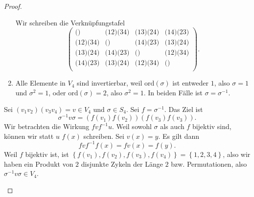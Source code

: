 \begin{proof}
\begin{parts}
\begin{enumerate}[label=(\roman*)]
	Wir schreiben die Verknüpfungstafel
\[
\left(
\begin{array}{cccc}
 \text{()} & \text{(12)(34)} & \text{(13)(24)} & \text{(14)(23)} \\
 \text{(12)(34)} & \text{()} & \text{(14)(23)} & \text{(13)(24)} \\
 \text{(13)(24)} & \text{(14)(23)} & \text{()} & \text{(12)(34)} \\
 \text{(14)(23)} & \text{(13)(24)} & \text{(12)(34)} & \text{()} \\
\end{array}
\right)
.\] 
\item Alle Elemente in $V_4$ sind invertierbar, weil $\text{ord}(\sigma)$ ist entweder $1$, also $\sigma=1$ und $\sigma^2=1$, oder $\text{ord}(\sigma)=2$, also $\sigma^2=1$. In beiden Fälle ist $\sigma=\sigma^{-1}$.
\end{enumerate}
\item Sei $(v_1v_2)(v_3v_4)=v\in V_4$ und $\sigma\in S_4$. Sei $f=\sigma^{-1}$. Das Ziel ist
\[
	\sigma^{-1}v\sigma=(f(v_1)f(v_2))(f(v_3)f(v_3))
.\] 
Wir betrachten die Wirkung $f v f^{-1} u$. Weil sowohl $\sigma$ als auch $f$ bijektiv sind, können wir statt $u$ $f(x)$ schreiben. Sei $v(x)=y$. Es gilt dann
\[
	fvf^{-1}f(x)=fv(x)=f(y)
.\]
Weil $f$ bijektiv ist, ist $\left\{ f(v_1),f(v_2),f(v_3),f(v_4) \right\} =\left\{ 1,2,3,4 \right\} $, also wir haben ein Produkt von $2$ disjunkte Zykeln der Länge $2$ bzw. Permutationen, also $\sigma^{-1}v\sigma\in V_4$.\qedhere
	\end{parts}
\end{proof}
